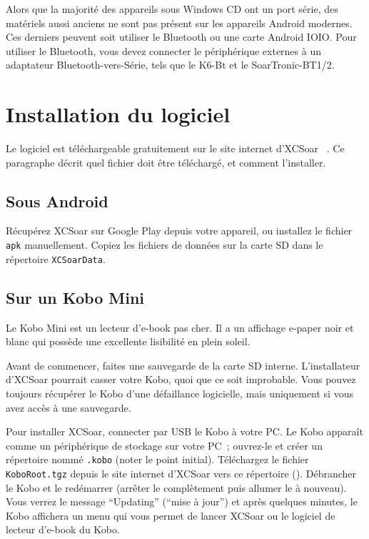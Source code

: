 Alors que la majorité des appareils sous Windows CD ont un port série, des matériels
aussi anciens ne sont pas présent sur les appareils Android modernes. Ces derniers peuvent soit
utiliser le Bluetooth ou une carte Android IOIO. Pour utiliser le Bluetooth, vous devez
connecter le périphérique externes à un adaptateur Bluetooth-vers-Série, tels
que le K6-Bt et le SoarTronic-BT1/2.

\section{Installation du logiciel}

Le logiciel est téléchargeable gratuitement sur le site internet d'XCSoar ~\xcsoarwebsite{}. Ce paragraphe décrit quel fichier doit être téléchargé, et comment l'installer.

\subsection*{Sous Android}

Récupérez XCSoar sur Google Play depuis votre appareil, ou installez le fichier \verb|apk|
manuellement. Copiez les fichiers de données sur la carte SD dans le répertoire \verb|XCSoarData|.

\subsection*{Sur un Kobo Mini}

Le Kobo Mini est un lecteur d'e-book pas cher. Il a un affichage
e-paper noir et blanc qui possède une excellente lisibilité en plein soleil.

Avant de commencer, faites une sauvegarde de la carte SD interne. L'installateur d'XCSoar
pourrait casser votre Kobo, quoi que ce soit improbable. Vous pouvez toujours récupérer le Kobo
d'une défaillance logicielle, mais uniquement si vous avez accès à une sauvegarde.

Pour installer XCSoar, connecter par USB le Kobo à votre PC. Le Kobo 
apparaît comme un périphérique de stockage sur votre PC~; ouvrez-le et créer un
répertoire nommé \texttt{.kobo} (noter le point initial). Téléchargez le 
fichier \texttt{KoboRoot.tgz} depuis le site internet d'XCSoar vers ce
répertoire (). Débrancher le Kobo et le redémarrer (arrêter le complètement
puis allumer le à nouveau). Vous verrez le message ``Updating'' (``mise à jour'') et
après quelques minutes, le Kobo affichera un menu qui vous permet de lancer
XCSoar ou le logiciel de lecteur d'\mbox{e-book} du Kobo.

